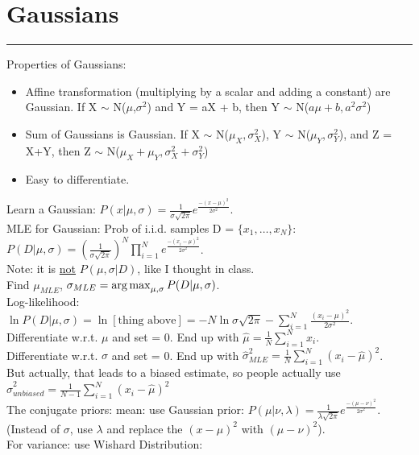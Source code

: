 \section{Gaussians}
\smallskip \hrule height 2pt \smallskip

Properties of Gaussians: 
\begin{itemize} 
	\item Affine transformation (multiplying by a scalar and adding a constant) are Gaussian.
		If X $\sim$ N($\mu$,$\sigma^2$) and Y = aX + b, then Y $\sim$ N($a\mu+b, a^2\sigma^2$) 
  	\item Sum of Gaussians is Gaussian.  
			If X $\sim$ N($\mu_X, \sigma^2_X$), 
			Y $\sim$ N($\mu_Y, \sigma^2_Y$), 
			and Z = X+Y, then 
			Z $\sim$ N($\mu_X+\mu_Y, \sigma_X^2 +\sigma_Y^2$)
	\item  Easy to differentiate.
\end{itemize}

Learn a Gaussian: $P(x | \mu, \sigma) = \frac{1}{\sigma \sqrt{2 \pi}}e^\frac{-(x-\mu)^2}{2\sigma^2}$. \hfill \\
MLE for Gaussian: Prob of i.i.d. samples D = $\{x_1, \dots, x_N\}$:  \hfill \\
$\displaystyle  P(D|\mu, \sigma) = ( \frac{1}{\sigma \sqrt{2 \pi}})^N \prod_{i=1}^N e^\frac{-(x_i-\mu)^2}{2\sigma^2}$.   \hfill \\
Note: it is \underline{not} $P(\mu, \sigma | D)$, like I thought in class.  \hfill \\
Find $\mu_{MLE}$, $\sigma_{MLE} = \operatorname*{arg\,max}_{\mu, \sigma} P(D | \mu, \sigma)$.  \hfill \\

Log-likelihood:  $ \displaystyle \ln P(D | \mu, \sigma) = \ln[\mbox{thing above}] = -N \ln \sigma \sqrt{2\pi} - \sum_{i=1}^N \frac{(x_i - \mu)^2}{2\sigma^2}$.  \hfill \\
Differentiate w.r.t. $\mu$ and set = 0.  End up with $ \displaystyle \widehat{\mu} = \frac{1}{N} \sum_{i=1}^N x_i$.  \hfill \\
Differentiate w.r.t. $\sigma$ and set = 0.  End up with $ \displaystyle \widehat{\sigma}^2_{MLE} = \frac{1}{N} \sum_{i=1}^N (x_i-\widehat{\mu})^2$.  \hfill \\
But actually, that leads to a biased estimate, so people actually use  $ \displaystyle \widehat{\sigma}^2_{unbiased} = \frac{1}{N-1} \sum_{i=1}^N (x_i-\widehat{\mu})^2$  \hfill \\

The conjugate priors: mean: use Gaussian prior:  $ \displaystyle  P(\mu | \nu, \lambda) = \frac{1}{\lambda \sqrt{2 \pi}}e^\frac{-(\mu - \nu)^2}{2\sigma^2} $.  (Instead of $\sigma$, use $\lambda$ and replace the $(x-\mu)^2$ with $(\mu - \nu)^2$).  \hfill \\
For variance: use Wishard Distribution:  